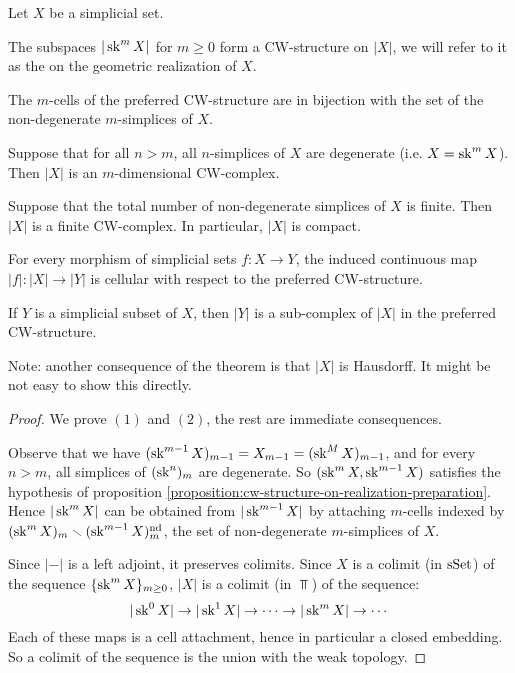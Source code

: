 \begin{theorem}\label{theorem:cw-structure-on-realization}
Let $X$ be a simplicial set.
\begin{numerate}
\item The subspaces $|\operatorname{sk}^m X|$ for $m\ge0$ form a CW-structure on $|X|$, we will refer to it as the  on the geometric realization of $X$.
\item The $m$-cells of the preferred CW-structure are in bijection with the set of the non-degenerate $m$-simplices of $X$.
\item Suppose that for all $n>m$, all $n$-simplices of $X$ are degenerate (i.e. $X=\operatorname{sk}^m X$). Then $|X|$ is an $m$-dimensional CW-complex.
\item Suppose that the total number of non-degenerate simplices of $X$ is finite. Then $|X|$ is a finite CW-complex. In particular, $|X|$ is compact.
\item For every morphism of simplicial sets $f:X\to Y$, the induced continuous map $|f|:|X|\to|Y|$ is cellular with respect to the preferred CW-structure.
\item If $Y$ is a simplicial subset of $X$, then $|Y|$ is a sub-complex of $|X|$ in the preferred CW-structure.
\end{numerate}
\end{theorem}

Note: another consequence of the theorem is that $|X|$ is Hausdorff. It might be not easy to show this directly.

\begin{proof}
We prove $(1)$ and $(2)$, the rest are immediate consequences.

Observe that we have $(\operatorname{sk}^{m-1} X)_{m-1}=X_{m-1}=(\operatorname{sk}^M X)_{m-1}$, and for every $n>m$, all simplices of $(\operatorname{sk}^n)_m$ are degenerate. So $(\operatorname{sk}^m X,\operatorname{sk}^{m-1} X)$ satisfies the hypothesis of proposition \ref{proposition:cw-structure-on-realization-preparation}. Hence $|\operatorname{sk}^m X|$ can be obtained from $|\operatorname{sk}^{m-1} X|$ by attaching $m$-cells indexed by $(\operatorname{sk}^m X)_m\smallsetminus(\operatorname{sk}^{m-1} X)_m^\text{nd}$, the set of non-degenerate $m$-simplices of $X$.

Since $|-|$ is a left adjoint, it preserves colimits. Since $X$ is a colimit (in ${\mathrm{sSet}}$) of the sequence $\{\operatorname{sk}^m X\}_{m\ge0}$, $|X|$ is a colimit (in $\Top$) of the sequence:
\[|\operatorname{sk}^0 X|\to|\operatorname{sk}^1 X|\to\cdots\to|\operatorname{sk}^m X|\to\cdots\]
Each of these maps is a cell attachment, hence in particular a closed embedding. So a colimit
of the sequence is the union with the weak topology.
\end{proof}

